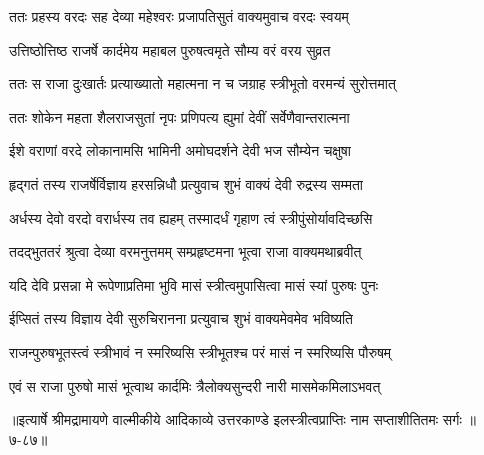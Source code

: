 \twolineshloka
{ततः प्रहस्य वरदः सह देव्या महेश्वरः}
{प्रजापतिसुतं वाक्यमुवाच वरदः स्वयम्} %

\twolineshloka
{उत्तिष्ठोत्तिष्ठ राजर्षे कार्दमेय महाबल}
{पुरुषत्वमृते सौम्य वरं वरय सुव्रत} %

\twolineshloka
{ततः स राजा दुःखार्तः प्रत्याख्यातो महात्मना}
{न च जग्राह स्त्रीभूतो वरमन्यं सुरोत्तमात्} %

\twolineshloka
{ततः शोकेन महता शैलराजसुतां नृपः}
{प्रणिपत्य ह्युमां देवीं सर्वेणैवान्तरात्मना} %

\twolineshloka
{ईशे वराणां वरदे लोकानामसि भामिनी}
{अमोघदर्शने देवी भज सौम्येन चक्षुषा} %

\twolineshloka
{हृद्गतं तस्य राजर्षेर्विज्ञाय हरसन्निधौ}
{प्रत्युवाच शुभं वाक्यं देवी रुद्रस्य सम्मता} %

\twolineshloka
{अर्धस्य देवो वरदो वरार्धस्य तव ह्यहम्}
{तस्मादर्धं गृहाण त्वं स्त्रीपुंसोर्यावदिच्छसि} %

\twolineshloka
{तदद्भुततरं श्रुत्वा देव्या वरमनुत्तमम्}
{सम्प्रहृष्टमना भूत्वा राजा वाक्यमथाब्रवीत्} %

\twolineshloka
{यदि देवि प्रसन्ना मे रूपेणाप्रतिमा भुवि}
{मासं स्त्रीत्वमुपासित्वा मासं स्यां पुरुषः पुनः} %

\twolineshloka
{ईप्सितं तस्य विज्ञाय देवी सुरुचिरानना}
{प्रत्युवाच शुभं वाक्यमेवमेव भविष्यति} %

\twolineshloka
{राजन्पुरुषभूतस्त्वं स्त्रीभावं न स्मरिष्यसि}
{स्त्रीभूतश्च परं मासं न स्मरिष्यसि पौरुषम्} %

\twolineshloka
{एवं स राजा पुरुषो मासं भूत्वाथ कार्दमिः}
{त्रैलोक्यसुन्दरी नारी मासमेकमिलाऽभवत्} %


॥इत्यार्षे श्रीमद्रामायणे वाल्मीकीये आदिकाव्ये उत्तरकाण्डे इलस्त्रीत्वप्राप्तिः नाम सप्ताशीतितमः सर्गः ॥७-८७॥
